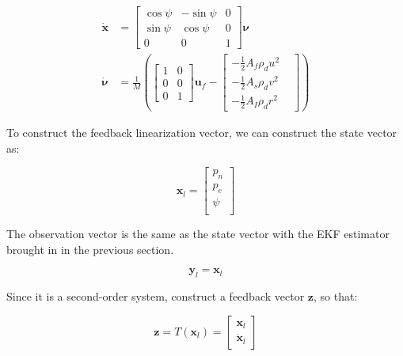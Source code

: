 \begin{align}
    \dot{\boldsymbol{x}} & =\left[\begin{array}{ccc}
        \cos{\psi} & -\sin{\psi} & 0  \\
        \sin{\psi} & \cos{\psi} & 0 \\
        0 & 0 & 1
    \end{array}\right]\boldsymbol{\nu} \\
    \dot{\boldsymbol{\nu}} & =\frac{1}{M}\left(\left[\begin{array}{cc}
        1 & 0 \\
        0 & 0\\
        0 & 1 
    \end{array}\right]\boldsymbol{u}_f-\left[\begin{aligned}
        -\frac{1}{2}A_f \rho_d u^2 & \\
        -\frac{1}{2}A_s \rho_d v^2 & \\
        -\frac{1}{2}A_I \rho_d r^2 &
    \end{aligned}\right]\right)
\end{align}

To construct the feedback linearization vector, we can construct the state vector as:

\begin{equation}
    \boldsymbol{x}_l=\left[\begin{array}{c}
        p_n  \\
        p_e  \\
        \psi \\
    \end{array}\right]
\end{equation}

The observation vector is the same as the state vector with the EKF estimator brought in in the previous section.

\begin{equation}
    \boldsymbol{y}_l=\boldsymbol{x}_l
\end{equation}

Since it is a second-order system, construct a feedback vector $\boldsymbol{z}$, so that:



\begin{equation}
    \boldsymbol{z}=T(\boldsymbol{x}_l)=\left[\begin{array}{c}
        \boldsymbol{x}_l  \\
        \dot{\boldsymbol{x}}_l
    \end{array}\right]
\end{equation}


